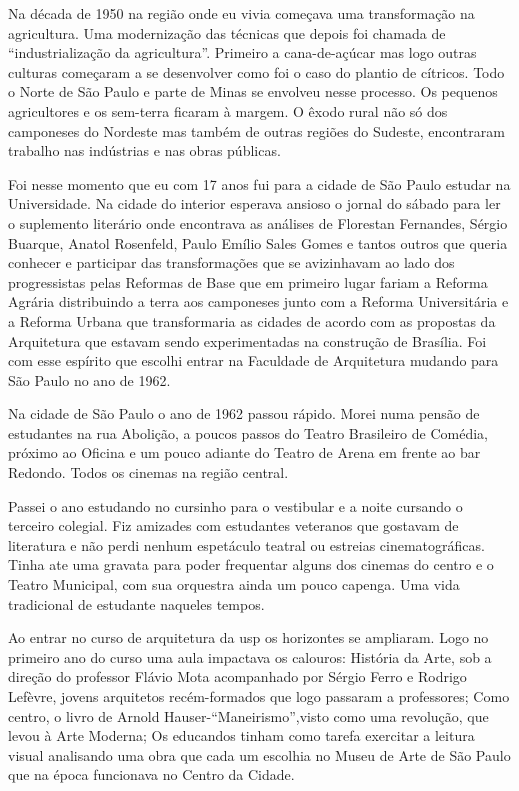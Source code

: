 Na década de 1950 na região onde eu vivia começava uma transformação na
agricultura. Uma modernização das técnicas que depois foi chamada de
“industrialização da agricultura”. Primeiro a cana-de-açúcar mas logo
outras culturas começaram a se desenvolver como foi o caso do plantio de
cítricos. Todo o Norte de São Paulo e parte de Minas se envolveu nesse
processo. Os pequenos agricultores e os sem-terra ficaram à margem. O
êxodo rural não só dos camponeses do Nordeste mas também de outras
regiões do Sudeste, encontraram trabalho nas indústrias e nas obras
públicas.

Foi nesse momento que eu com 17 anos fui para a cidade de São Paulo
estudar na Universidade. Na cidade do interior esperava ansioso o jornal
do sábado para ler o suplemento literário onde encontrava as análises de
Florestan Fernandes, Sérgio Buarque, Anatol Rosenfeld, Paulo Emílio
Sales Gomes e tantos outros que queria conhecer e participar das
transformações que se avizinhavam ao lado dos progressistas pelas
Reformas de Base que em primeiro lugar fariam a Reforma Agrária
distribuindo a terra aos camponeses junto com a Reforma Universitária e
a Reforma Urbana que transformaria as cidades de acordo com as propostas
da Arquitetura que estavam sendo experimentadas na construção de
Brasília. Foi com esse espírito que escolhi entrar na Faculdade de
Arquitetura mudando para São Paulo no ano de 1962.

\subject{São Paulo e a {\cap fau}}

Na cidade de São Paulo o ano de 1962 passou rápido. Morei numa pensão de
estudantes na rua Abolição, a poucos passos do Teatro Brasileiro de
Comédia, próximo ao Oficina e um pouco adiante do Teatro de Arena em
frente ao bar Redondo. Todos os cinemas na região central.

Passei o ano estudando no cursinho para o vestibular e a noite cursando
o terceiro colegial. Fiz amizades com estudantes veteranos que gostavam
de literatura e não perdi nenhum espetáculo teatral ou estreias
cinematográficas. Tinha ate uma gravata para poder frequentar alguns dos
cinemas do centro e o Teatro Municipal, com sua orquestra ainda um pouco
capenga. Uma vida tradicional de estudante naqueles tempos.

Ao entrar no curso de arquitetura da {\sc usp} os horizontes se ampliaram.
Logo no primeiro ano do curso uma aula impactava os calouros: História
da Arte, sob a direção do professor Flávio Mota acompanhado por Sérgio
Ferro e Rodrigo Lefèvre, jovens arquitetos recém-formados que logo
passaram a professores; Como centro, o livro de Arnold
Hauser-“Maneirismo”,visto como uma revolução, que levou à Arte Moderna;
Os educandos tinham como tarefa exercitar a leitura visual analisando
uma obra que cada um escolhia no Museu de Arte de São Paulo que na época
funcionava no Centro da Cidade.

